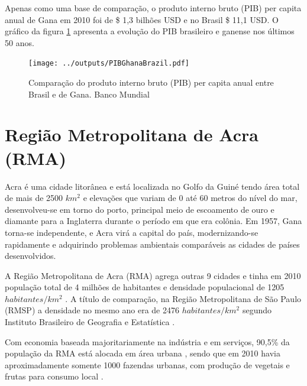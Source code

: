 Apenas como uma base de comparação, o produto interno bruto (PIB) per capita 
anual de Gana em 2010 foi de \$ 1,3 bilhões USD e no Brasil \$ 11,1 USD. 
O gráfico da figura \ref{fg:pib} apresenta a evolução do PIB brasileiro e 
ganense nos últimos 50 anos.

\begin{figure}[H]
  \centering
  \texttt{[image: ../outputs/PIBGhanaBrazil.pdf]}
  \caption{Comparação do produto interno bruto (PIB) per capita anual entre 
           Brasil e de Gana. Banco Mundial \citeyearpar{bancomundial} 
          \label{fg:pib}}
\end{figure}


\newpage
\section{Região Metropolitana de Acra (RMA)}

Acra é uma cidade litorânea e está localizada no Golfo da Guiné tendo área total
de mais de  2500 $km^2$ e elevações que variam de 0 até 60 metros do nível do 
mar, desenvolveu-se em torno do porto, principal meio de escoamento de ouro e 
diamante para a Inglaterra durante o período em que era colônia. 
Em 1957, Gana torna-se independente, e Acra virá a capital do país, 
modernizando-se rapidamente e adquirindo problemas ambientais comparáveis as 
cidades de países desenvolvidos. 

A Região Metropolitana de Acra (RMA) agrega outras 9 cidades e tinha em 2010
população total de 4 milhões de habitantes e densidade populacional de 
1205 $habitantes/km^2$ \citep{ghanacensus2013}. 
A título de comparação, na Região Metropolitana de São 
Paulo (RMSP) a densidade no mesmo ano era de 2476 $habitantes/km^2$ 
segundo Instituto Brasileiro de Geografia e Estatística \citep{ibge2011}. 

Com economia baseada majoritariamente na indústria e em serviços, 90,5\% da 
população da RMA está alocada em área urbana \citep{ghanacensus2013}, sendo
que em 2010 havia aproximadamente somente 1000 fazendas urbanas, com produção de 
vegetais e frutas para consumo local \citep{lente2014}. 
 
